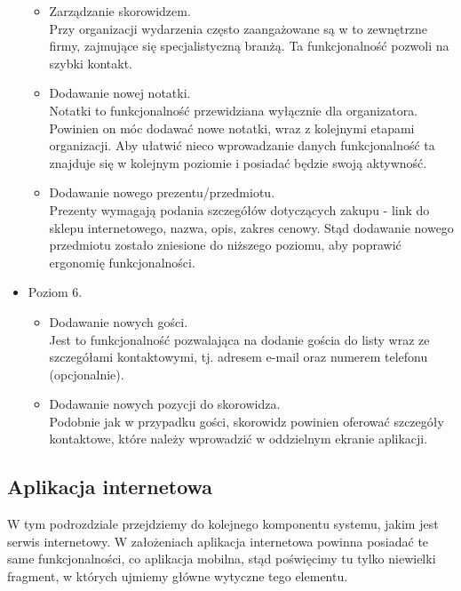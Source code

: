 \documentclass[12pt,titlepage]{article}
\begin{document}
\begin{itemize}
\begin{itemize}
	\item Zarządzanie skorowidzem.
	\\Przy organizacji wydarzenia często zaangażowane są w to zewnętrzne firmy, zajmujące się specjalistyczną branżą. Ta funkcjonalność pozwoli na szybki kontakt.
	\item Dodawanie nowej notatki.
	\\Notatki to funkcjonalność przewidziana wyłącznie dla organizatora. Powinien on móc dodawać nowe notatki, wraz z kolejnymi etapami organizacji. Aby ułatwić nieco wprowadzanie danych
	funkcjonalność ta znajduje się w kolejnym poziomie i posiadać będzie swoją aktywność.
	\item Dodawanie nowego prezentu/przedmiotu.
	\\Prezenty wymagają podania szczegółów dotyczących zakupu - link do sklepu internetowego, nazwa, opis, zakres cenowy. Stąd dodawanie nowego przedmiotu zostało zniesione do niższego poziomu,
	aby poprawić ergonomię funkcjonalności.
      \end{itemize}
 \item Poziom 6.
      \begin{itemize}
       \item Dodawanie nowych gości.
       \\Jest to funkcjonalność pozwalająca na dodanie gościa do listy wraz ze szczegółami kontaktowymi, tj. adresem e-mail oraz numerem telefonu (opcjonalnie).
       \item Dodawanie nowych pozycji do skorowidza.
       \\Podobnie jak w przypadku gości, skorowidz powinien oferować szczegóły kontaktowe, które należy wprowadzić w oddzielnym ekranie aplikacji.
      \end{itemize}
      
\end{itemize}

\subsection{Aplikacja internetowa}
W tym podrozdziale przejdziemy do kolejnego komponentu systemu, jakim jest serwis internetowy.
W założeniach aplikacja internetowa powinna posiadać te same funkcjonalności, co aplikacja mobilna, stąd poświęcimy tu tylko niewielki fragment, w których ujmiemy główne wytyczne tego elementu. 
\end{document}

